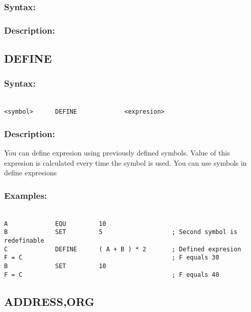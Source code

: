         \subsubsection{Syntax:}

        \subsubsection{Description:}

    \subsection{DEFINE}
        \subsubsection{Syntax:}
        {
            ~\\
            \usecodefont        
            \verb'<symbol>      DEFINE             <expresion>'
        }
        \subsubsection{Description:}
        You can define expresion using previously defined symbols. Value of this expresion is calculated every time the symbol is used. You can use symbols in define expresions

        \subsubsection{Examples:}
        {
            ~\\
            \usecodefont
            \verb'A             EQU         10'\\
            \verb'B             SET         5                   ; Second symbol is redefinable'\\
            \verb'C             DEFINE      ( A + B ) * 2       ; Defined expresion'\\
            \verb'F = C                                         ; F equals 30'\\
            \verb'B             SET         10'\\
            \verb'F = C                                         ; F equals 40'\\
        }

    \subsection{ADDRESS,ORG}
